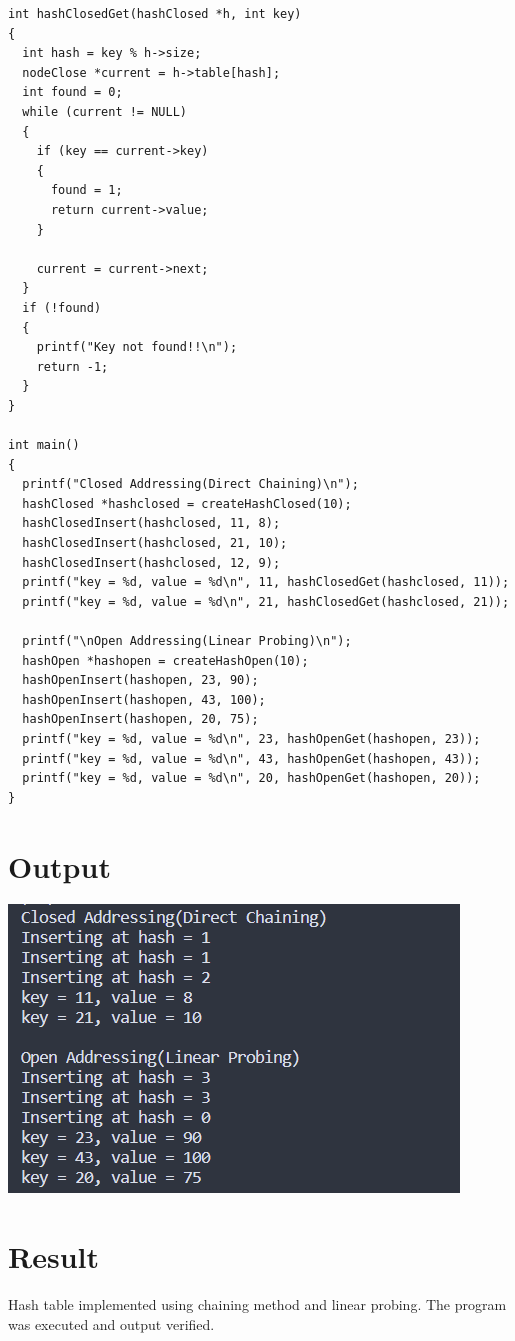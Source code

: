 \begin{lstlisting}[label={list:c_program:polynomial_operations}]
int hashClosedGet(hashClosed *h, int key)
{
  int hash = key % h->size;
  nodeClose *current = h->table[hash];
  int found = 0;
  while (current != NULL)
  {
    if (key == current->key)
    {
      found = 1;
      return current->value;
    }

    current = current->next;
  }
  if (!found)
  {
    printf("Key not found!!\n");
    return -1;
  }
}

int main()
{
  printf("Closed Addressing(Direct Chaining)\n");
  hashClosed *hashclosed = createHashClosed(10);
  hashClosedInsert(hashclosed, 11, 8);
  hashClosedInsert(hashclosed, 21, 10);
  hashClosedInsert(hashclosed, 12, 9);
  printf("key = %d, value = %d\n", 11, hashClosedGet(hashclosed, 11));
  printf("key = %d, value = %d\n", 21, hashClosedGet(hashclosed, 21));

  printf("\nOpen Addressing(Linear Probing)\n");
  hashOpen *hashopen = createHashOpen(10);
  hashOpenInsert(hashopen, 23, 90);
  hashOpenInsert(hashopen, 43, 100);
  hashOpenInsert(hashopen, 20, 75);
  printf("key = %d, value = %d\n", 23, hashOpenGet(hashopen, 23));
  printf("key = %d, value = %d\n", 43, hashOpenGet(hashopen, 43));
  printf("key = %d, value = %d\n", 20, hashOpenGet(hashopen, 20));
}
\end{lstlisting}

\section{Output}
\includegraphics[]{Cycle_2/Outputs/Hashing.png}

\section{Result}
Hash table implemented using chaining method and linear probing. The program was
executed and output verified.
